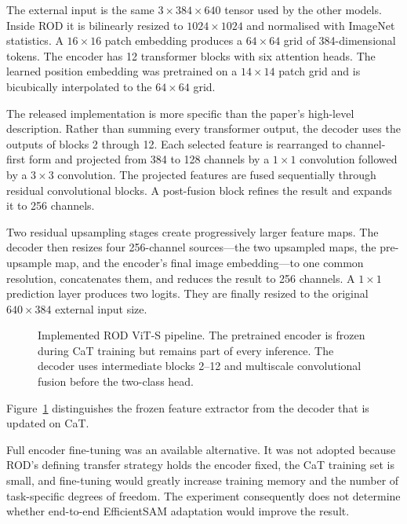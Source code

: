 The external input is the same $3\times384\times640$ tensor used by the other
models. Inside ROD it is bilinearly resized to $1024\times1024$ and normalised
with ImageNet statistics. A $16\times16$ patch embedding produces a
$64\times64$ grid of 384-dimensional tokens. The encoder has 12 transformer
blocks with six attention heads. The learned position embedding was pretrained
on a $14\times14$ patch grid and is bicubically interpolated to the $64\times64$
grid.

The released implementation is more specific than the paper's high-level
description. Rather than summing every transformer output, the decoder uses
the outputs of blocks 2 through 12. Each selected feature is
rearranged to channel-first form and projected from 384 to 128 channels by a
$1\times1$ convolution followed by a $3\times3$ convolution. The projected
features are fused sequentially through residual convolutional blocks. A
post-fusion block refines the result and expands it to 256 channels.

Two residual upsampling stages create progressively larger feature maps. The
decoder then resizes four 256-channel sources---the two upsampled maps, the
pre-upsample map, and the encoder's final image embedding---to one common
resolution, concatenates them, and reduces the result to 256 channels. A
$1\times1$ prediction layer produces two logits. They are finally resized to
the original $640\times384$ external input size.

\begin{figure}[H]
\centering
\resizebox{\textwidth}{!}{}
\caption[Implemented ROD ViT-S pipeline.]{Implemented ROD ViT-S pipeline. The
pretrained encoder is frozen during CaT training but remains part of every
inference. The decoder uses intermediate blocks 2--12 and multiscale
convolutional fusion before the two-class head.}
\label{fig:rod_architecture}
\end{figure}

Figure~\ref{fig:rod_architecture} distinguishes the frozen feature extractor
from the decoder that is updated on CaT.

Full encoder fine-tuning was an available alternative. It was not adopted
because ROD's defining transfer strategy holds the encoder fixed, the CaT
training set is small, and fine-tuning would greatly increase training memory
and the number of task-specific degrees of freedom. The experiment consequently
does not determine whether end-to-end EfficientSAM adaptation would improve the
result.

